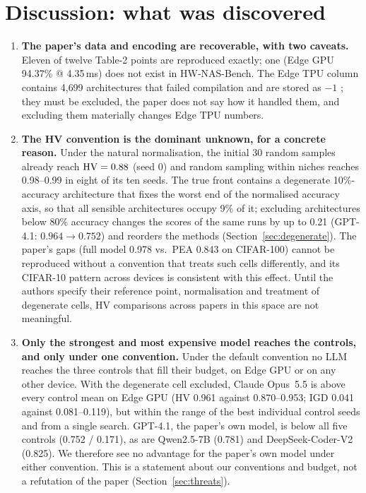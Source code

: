 \section{Discussion: what was discovered}\label{sec:discussion}
\begin{enumerate}
  \item \textbf{The paper's data and encoding are recoverable, with two caveats.} Eleven of twelve Table-2 points are reproduced exactly; one (Edge GPU 94.37\% @ 4.35\,ms) does not exist in HW-NAS-Bench. The Edge TPU column contains 4{,}699 architectures that failed compilation and are stored as $-1$ \cite{hwnasissue}; they must be excluded, the paper does not say how it handled them, and excluding them materially changes Edge TPU numbers.
  \item \textbf{The HV convention is the dominant unknown, for a concrete reason.} Under the natural normalisation, the initial 30 random samples already reach $\mathrm{HV}=0.88$ (seed 0) and random sampling within niches reaches 0.98--0.99 in eight of its ten seeds. The true front contains a degenerate 10\%-accuracy architecture that fixes the worst end of the normalised accuracy axis, so that all sensible architectures occupy 9\% of it; excluding architectures below 80\% accuracy changes the scores of the same runs by up to 0.21 (GPT-4.1: $0.964\to0.752$) and reorders the methods (Section~\ref{sec:degenerate}). The paper's gaps (full model 0.978 vs.\ PEA 0.843 on CIFAR-100) cannot be reproduced without a convention that treats such cells differently, and its CIFAR-10 pattern across devices is consistent with this effect. Until the authors specify their reference point, normalisation and treatment of degenerate cells, HV comparisons across papers in this space are not meaningful.
  \item \textbf{Only the strongest and most expensive model reaches the controls, and only under one convention.} Under the default convention no LLM reaches the three controls that fill their budget, on Edge GPU or on any other device. With the degenerate cell excluded, Claude Opus~5.5 is above every control mean on Edge GPU (HV 0.961 against 0.870--0.953; IGD 0.041 against 0.081--0.119), but within the range of the best individual control seeds and from a single search. GPT-4.1, the paper's own model, is below all five controls (0.752 / 0.171), as are Qwen2.5-7B (0.781) and DeepSeek-Coder-V2 (0.825). We therefore see no advantage for the paper's own model under either convention. This is a statement about our conventions and budget, not a refutation of the paper (Section~\ref{sec:threats}).

\end{enumerate}
